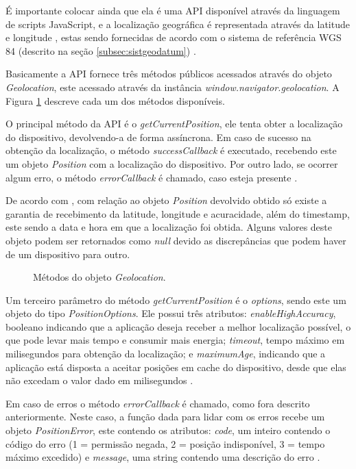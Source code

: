 \documentclass[diss]{template/setrem}
\begin{document}
É importante colocar ainda que ela é uma API disponível através da linguagem de scripts JavaScript, e a localização geográfica é representada através da latitude e longitude \citep{Pilgrim2010}, estas sendo fornecidas de acordo com o sistema de referência WGS 84 (descrito na seção \ref{subsec:sistgeodatum}) \citep{Popescu2009}.

Basicamente a API fornece três métodos públicos acessados através do objeto \emph{Geolocation}, este acessado através da instância \emph{window.navigator.geolocation}. A Figura \ref{fig:w3c-geo} descreve cada um dos métodos disponíveis.


O principal método da API é o \emph{getCurrentPosition}, ele tenta obter a localização do dispositivo, devolvendo-a de forma assíncrona. Em caso de sucesso na obtenção da localização, o método \emph{successCallback} é executado, recebendo este um objeto \emph{Position} com a localização do dispositivo. Por outro lado, se ocorrer algum erro, o método \emph{errorCallback} é chamado, caso esteja presente \citep{Popescu2009}.

De acordo com \citet{Pilgrim2010}, com relação ao objeto \emph{Position} devolvido obtido só existe a garantia de recebimento da latitude, longitude e acuracidade, além do timestamp, este sendo a data e hora em que a localização foi obtida. Alguns valores deste objeto podem ser retornados como \emph{null} devido as discrepâncias que podem haver de um dispositivo para outro.

\begin{figure}[!h]
    \caption{Métodos do objeto \emph{Geolocation}.}
    \label{fig:w3c-geo}
\end{figure}

Um terceiro parâmetro do método \emph{getCurrentPosition} é o \emph{options}, sendo este um objeto do tipo \emph{PositionOptions}. Ele possui três atributos: \emph{enableHighAccuracy}, booleano indicando que a aplicação deseja receber a melhor localização possível, o que pode levar mais tempo e consumir mais energia; \emph{timeout}, tempo máximo em milisegundos para obtenção da localização; e \emph{maximumAge}, indicando que a aplicação está disposta a aceitar posições em cache do dispositivo, desde que elas não excedam o valor dado em milisegundos \citep{Popescu2009}.

Em caso de erros o método \emph{errorCallback} é chamado, como fora descrito anteriormente. Neste caso, a função dada para lidar com os erros recebe um objeto \emph{PositionError}, este contendo os atributos: \emph{code}, um inteiro contendo o código do erro (1 = permissão negada, 2 = posição indisponível, 3 = tempo máximo excedido) e \emph{message}, uma string contendo uma descrição do erro \citep{Popescu2009}.
\end{document}
